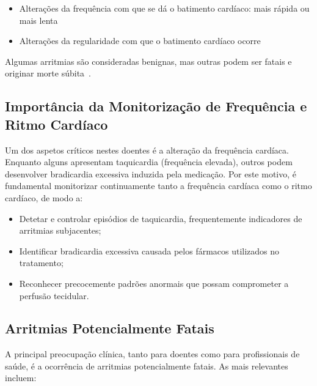 \documentclass[11pt,a4paper]{article}
\begin{document}
\begin{itemize}
      \item Alterações da frequência com que se dá o batimento cardíaco: mais rápida ou mais lenta
      \item Alterações da regularidade com que o batimento cardíaco ocorre
\end{itemize}

Algumas arritmias são consideradas benignas, mas outras podem ser fatais e originar morte súbita~\cite{SNS24Arritmias}.

\subsection*{Importância da Monitorização de Frequência e Ritmo Cardíaco}

Um dos aspetos críticos nestes doentes é a alteração da frequência cardíaca.
Enquanto alguns apresentam taquicardia (frequência elevada), 
outros podem desenvolver bradicardia excessiva induzida
pela medicação. Por este motivo, é fundamental monitorizar continuamente tanto
a frequência cardíaca como o ritmo cardíaco, de modo a:
\begin{itemize}
    \item Detetar e controlar episódios de taquicardia, frequentemente indicadores de
          arritmias subjacentes;
    \item Identificar bradicardia excessiva causada pelos fármacos utilizados no
          tratamento;
    \item Reconhecer precocemente padrões anormais que possam comprometer a perfusão
          tecidular.
\end{itemize}

\subsection*{Arritmias Potencialmente Fatais}

A principal preocupação clínica, tanto para doentes como para profissionais de
saúde, é a ocorrência de arritmias potencialmente fatais. As mais relevantes
incluem:
\end{document}
